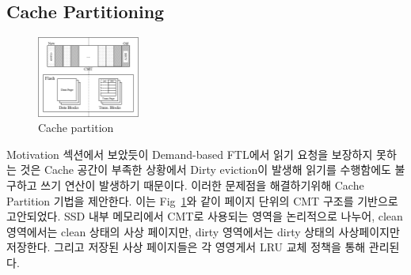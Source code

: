 \documentclass[conference]{IEEEtran}
\begin{document}
\subsection{Cache Partitioning}
\begin{figure}[h]
	\centering
	\includegraphics[width=0.3\textwidth]{image/PTSD/cache.png}
	\caption{Cache partition}
	\label{fig:cache}
\end{figure}
Motivation 섹션에서 보았듯이 Demand-based FTL에서 읽기 요청을 보장하지 못하는 것은 Cache 공간이 부족한 상황에서 Dirty eviction이 발생해 읽기를 수행함에도 불구하고 쓰기 연산이 발생하기 때문이다. 이러한 문제점을 해결하기위해 Cache Partition 기법을 제안한다. 이는 Fig~\ref{fig:cache}와 같이 페이지 단위의 CMT 구조를 기반으로 고안되었다. SSD 내부 메모리에서 CMT로 사용되는 영역을 논리적으로 나누어, clean 영역에서는 clean 상태의 사상 페이지만, dirty 영역에서는 dirty 상태의 사상페이지만 저장한다. 그리고 저장된 사상 페이지들은 각 영영게서 LRU 교체 정책을 통해 관리된다.\par
\end{document}
